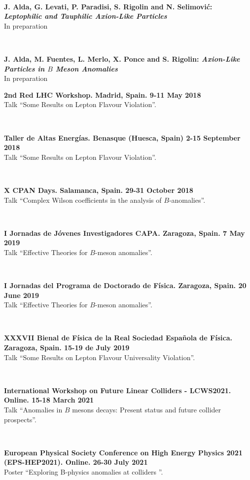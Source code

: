 \documentclass{cvf}
\begin{document}
~

\textbf{J. Alda, G. Levati, P. Paradisi, S. Rigolin and N. Selimovi\'c: \textit{Leptophilic and Tauphilic Axion-Like Particles}}\\
In preparation

~

\textbf{J. Alda, M. Fuentes, L. Merlo, X. Ponce and S. Rigolin: \textit{Axion-Like Particles in $B$ Meson Anomalies}}\\
In preparation


\hspace{\parindent}\textbf{2nd Red LHC Workshop. Madrid, Spain. 9-11 May 2018}\\
Talk ``Some Results on Lepton Flavour Violation''.

~

\textbf{Taller de Altas Energías. Benasque (Huesca, Spain) 2-15 September 2018}\\
Talk ``Some Results on Lepton Flavour Violation''.

~

\textbf{X CPAN Days. Salamanca, Spain. 29-31 October 2018}\\
Talk ``Complex Wilson coefficients in the analysis of $B$-anomalies''.

~

\textbf{I Jornadas de Jóvenes Investigadores CAPA. Zaragoza, Spain. 7 May 2019}\\
Talk ``Effective Theories for $B$-meson anomalies''.

~

\textbf{I Jornadas del Programa de Doctorado de Física. Zaragoza, Spain. 20 June 2019}\\
Talk ``Effective Theories for $B$-meson anomalies''.

~

\textbf{XXXVII Bienal de Física de la Real Sociedad Española de Física. Zaragoza, Spain. 15-19 de July 2019}\\
Talk ``Some Results on Lepton Flavour Universality Violation''.

~

\textbf{International Workshop on Future Linear Colliders - LCWS2021. Online. 15-18 March 2021}\\
Talk ``Anomalies in $B$ mesons decays: Present status and future collider prospects''.

~

\textbf{European Physical Society Conference on High Energy Physics 2021 (EPS-HEP2021). Online. 26-30 July 2021}\\
Poster ``Exploring B-physics anomalies at colliders ''.
\end{document}
